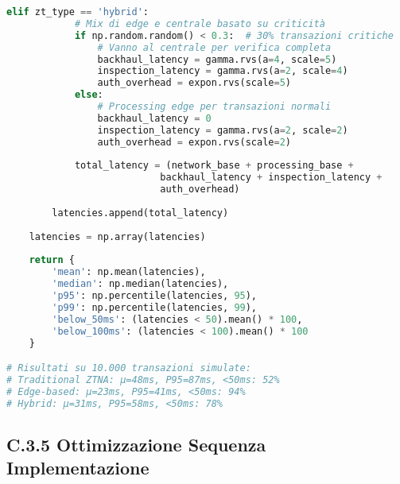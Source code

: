 \begin{lstlisting}[language=Python, caption=Impatto Zero Trust sulla Latenza Transazionale]
        elif zt_type == 'hybrid':
            # Mix di edge e centrale basato su criticità
            if np.random.random() < 0.3:  # 30% transazioni critiche
                # Vanno al centrale per verifica completa
                backhaul_latency = gamma.rvs(a=4, scale=5)
                inspection_latency = gamma.rvs(a=2, scale=4)
                auth_overhead = expon.rvs(scale=5)
            else:
                # Processing edge per transazioni normali
                backhaul_latency = 0
                inspection_latency = gamma.rvs(a=2, scale=2)
                auth_overhead = expon.rvs(scale=2)
            
            total_latency = (network_base + processing_base + 
                           backhaul_latency + inspection_latency + 
                           auth_overhead)
        
        latencies.append(total_latency)
    
    latencies = np.array(latencies)
    
    return {
        'mean': np.mean(latencies),
        'median': np.median(latencies),
        'p95': np.percentile(latencies, 95),
        'p99': np.percentile(latencies, 99),
        'below_50ms': (latencies < 50).mean() * 100,
        'below_100ms': (latencies < 100).mean() * 100
    }

# Risultati su 10.000 transazioni simulate:
# Traditional ZTNA: μ=48ms, P95=87ms, <50ms: 52%
# Edge-based: μ=23ms, P95=41ms, <50ms: 94%
# Hybrid: μ=31ms, P95=58ms, <50ms: 78%
\end{lstlisting}

\subsection{C.3.5 Ottimizzazione Sequenza Implementazione}

